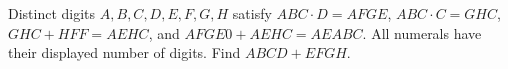 Distinct digits $A,B,C,D,E,F,G,H$ satisfy $ABC\cdot D=AFGE$, $ABC\cdot C=GHC$, $GHC+HFF=AEHC$, and $AFGE0+AEHC=AEABC$. All numerals have their displayed number of digits. Find $ABCD+EFGH$.
